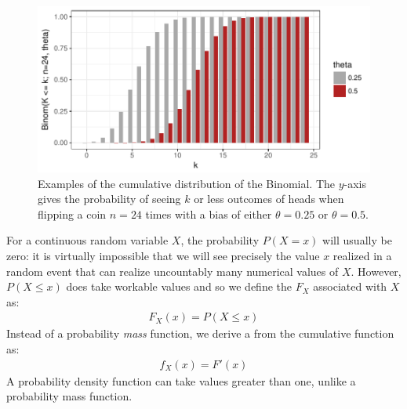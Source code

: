 \documentclass[nobib,nofonts]{tufte-handout}
\begin{document}
\begin{example}
\begin{figure}
  \centering
  \includegraphics[width=\textwidth]{00-pics/05_00_binomial-distribution-cumulative.pdf}
  \caption{Examples of the cumulative distribution of the Binomial. The $y$-axis gives the
    probability of seeing $k$ or less outcomes of heads when flipping a coin $n=24$ times with
    a bias of either $\theta = 0.25$ or $\theta = 0.5$.}
  \label{fig:BinomialDistributionCumulative}
\end{figure}

\end{example}

For a continuous random variable $X$, the probability $P(X = x)$ will usually be zero: it is
virtually impossible that we will see precisely the value $x$ realized in a random event that
can realize uncountably many numerical values of $X$. However, $P(X \le x)$ does take workable
values and so we define the  $F_X$
associated with $X$ as:
\begin{align*}
  F_X(x) = P(X \le x)
\end{align*}
Instead of a probability \emph{mass} function, we derive a  from the cumulative function as:
\begin{align*}
  f_X(x) = F'(x)
\end{align*}
A probability density function can take values greater than one, unlike a probability mass
function.
\end{document}
